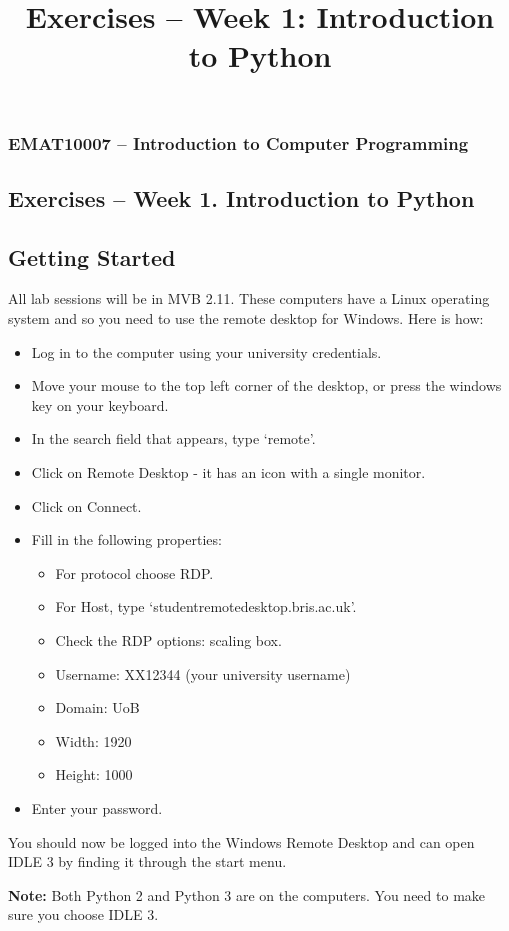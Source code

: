 \documentclass[12pt]{article}
\begin{document}
\title{Exercises -- Week 1: Introduction to Python}
\subsubsection*{EMAT10007 -- Introduction to Computer Programming}
\subsection*{\Large Exercises -- Week 1. Introduction to Python}

\subsection*{Getting Started}
All lab sessions will be in MVB 2.11. These computers have a Linux operating system and so you need to use the remote desktop for Windows. Here is how:
\begin{itemize}
    \item Log in to the computer using your university credentials.
    \item Move your mouse to the top left corner of the desktop, or press the windows key on your keyboard.
    \item In the search field that appears, type `remote'.
    \item Click on Remote Desktop - it has an icon with a single monitor.
    \item Click on Connect.
    \item Fill in the following properties:
    \begin{itemize}
        \item For protocol choose RDP.
        \item For Host, type `studentremotedesktop.bris.ac.uk'.
        \item Check the RDP options: scaling box.
        \item Username: XX12344 (your university username)
        \item Domain: UoB
        \item Width: 1920
        \item Height: 1000
    \end{itemize}
    \item Enter your password.
\end{itemize}
You should now be logged into the Windows Remote Desktop and can open IDLE 3 by finding it through the start menu.

\textbf{Note: } Both Python 2 and Python 3 are on the computers. You need to make sure you choose IDLE 3.
\end{document}
